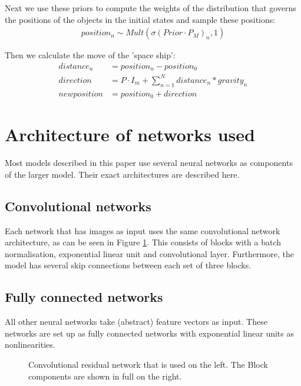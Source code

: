 \documentclass{report}
\begin{document}
\begin{appendices}
Next we use these priors to compute the weights of the distribution that governs the positions of the objects in the initial states and sample these positions:
\begin{align}
position_n \sim Mult(\sigma(Prior \cdot P_M)_n, 1)    
\end{align}

Then we calculate the move of the 'space ship':
\begin{align}
    distance_n &= position_n - position_0\\
    direction &= P \cdot I_m +\sum\limits^N_{n=1} distance_n * gravity_n\\
    new position &= position_0 + direction
\end{align}

\chapter*{Architecture of networks used}
Most models described in this paper use several neural networks as components of the larger model. Their exact architectures are described here.

\section*{Convolutional networks}
Each network that has images as input uses the same convolutional network architecture, as can be seen in Figure \ref{fig:conv_net}. This consists of blocks with a batch normalisation, exponential linear unit and convolutional layer. Furthermore, the model has several skip connections between each set of three blocks.

\section*{Fully connected networks}
All other neural networks take (abstract) feature vectors as input. These networks are set up as fully connected networks with exponential linear units as nonlinearities.

\begin{figure}
    \centering
    
    \hspace{1cm}
    
    \caption{Convolutional residual network that is used on the left. The Block components are shown in full on the right.}
    \label{fig:conv_net}
\end{figure}


\end{appendices}
\end{document}
